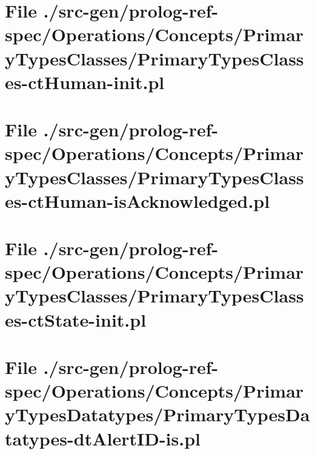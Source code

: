 \section[File /src-gen/prolog-ref-spec/Operations.../PrimaryTypesClasses-ctHuman-init.pl]{File ./src-gen/prolog-ref-spec/Operations/Concepts/PrimaryTypesClasses/PrimaryTypesClasses-ctHuman-init.pl}
\scriptsize

\normalsize
	
\section[File /src-gen/prolog-ref-spec.../PrimaryTypesClasses-ctHuman-isAcknowledged.pl]{File ./src-gen/prolog-ref-spec/Operations/Concepts/PrimaryTypesClasses/PrimaryTypesClasses-ctHuman-isAcknowledged.pl}
\scriptsize

\normalsize
	
\section[File /src-gen/prolog-ref-spec/Operations.../PrimaryTypesClasses-ctState-init.pl]{File ./src-gen/prolog-ref-spec/Operations/Concepts/PrimaryTypesClasses/PrimaryTypesClasses-ctState-init.pl}
\scriptsize

\normalsize
	
\section[File /src-gen/prolog-ref-spec.../PrimaryTypesDatatypes-dtAlertID-is.pl]{File ./src-gen/prolog-ref-spec/Operations/Concepts/PrimaryTypesDatatypes/PrimaryTypesDatatypes-dtAlertID-is.pl}
\scriptsize

\normalsize
	
